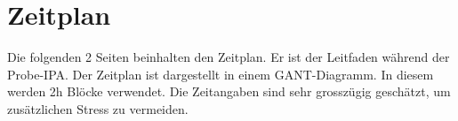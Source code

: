\chapter{Zeitplan}\label{ch:zeitplan}
Die folgenden 2 Seiten beinhalten den Zeitplan. Er ist der Leitfaden während der Probe-IPA. Der Zeitplan ist dargestellt in einem GANT-Diagramm. In diesem werden 2h Blöcke verwendet. Die Zeitangaben sind sehr grosszügig geschätzt, um zusätzlichen Stress zu vermeiden.
\begin{landscape}
	
\end{landscape}